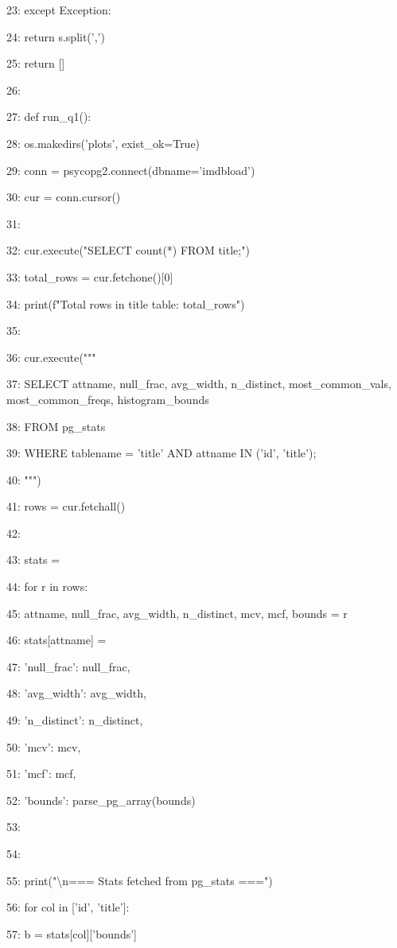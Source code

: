 \documentclass[11pt,a4paper]{article}
\begin{document}
23:         except Exception:

24:             return s.split(',')

25:     return []

26:

27: def run\_q1():

28:     os.makedirs('plots', exist\_ok=True)

29:     conn = psycopg2.connect(dbname='imdbload')

30:     cur = conn.cursor()

31:

32:     cur.execute("SELECT count(*) FROM title;")

33:     total\_rows = cur.fetchone()[0]

34:     print(f"Total rows in title table: {total\_rows}")

35:

36:     cur.execute("""

37:         SELECT attname, null\_frac, avg\_width, n\_distinct, most\_common\_vals, most\_common\_freqs, histogram\_bounds

38:         FROM pg\_stats

39:         WHERE tablename = 'title' AND attname IN ('id', 'title');

40:     """)

41:     rows = cur.fetchall()

42:

43:     stats = {}

44:     for r in rows:

45:         attname, null\_frac, avg\_width, n\_distinct, mcv, mcf, bounds = r

46:         stats[attname] = {

47:             'null\_frac': null\_frac,

48:             'avg\_width': avg\_width,

49:             'n\_distinct': n\_distinct,

50:             'mcv': mcv,

51:             'mcf': mcf,

52:             'bounds': parse\_pg\_array(bounds)

53:         }

54:

55:     print("\textbackslash{}n=== Stats fetched from pg\_stats ===")

56:     for col in ['id', 'title']:

57:         b = stats[col]['bounds']
\end{document}
